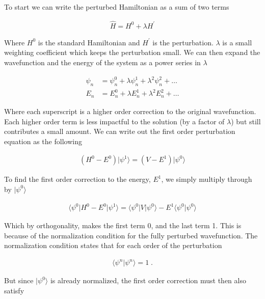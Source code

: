         To start we can write the perturbed Hamiltonian as a sum of two terms

        \begin{align}
            \hat{H} = H^0 + \lambda H^\prime
        \end{align}

        Where $H^0$ is the standard Hamiltonian and $H^\prime$ is the perturbation. $\lambda$ is a small weighting coefficient which keeps the perturbation small. We can then expand the wavefunction and the energy of the system as a power series in $\lambda$

        \begin{align}
            \psi_n &= \psi_n^0 + \lambda \psi_n^1 + \lambda^2 \psi_n^2 + \dots\\
            E_n &= E_n^0 + \lambda E_n^1 + \lambda^2 E_n^2 + \dots
        \end{align}

        Where each superscript is a higher order correction to the original wavefunction. Each higher order term is less impactful to the solution (by a factor of $\lambda$) but still contributes a small amount. We can write out the first order perturbation equation as the following

        \begin{align}
            \left( H^0 - E^0 \right) \vert \psi^1 \rangle = \left(V - E^1 \right) \vert \psi^0 \rangle
        \end{align}

        To find the first order correction to the energy, $E^1$, we simply multiply through by $\vert \psi^0 \rangle$

        \begin{align}
            \langle \psi^0 \vert H^0 - E^0 \vert \psi^1 \rangle = \langle \psi^0 \vert V \vert \psi^0 \rangle -E^1 \langle \psi^0  \vert \psi^0 \rangle
        \end{align}

        Which by orthogonality, makes the first term 0, and the last term 1. This is because of the normalization condition for the fully perturbed wavefunction. The normalization condition states that for each order of the perturbation 
        
        \begin{align}
            \langle \psi^n \vert \psi^n \rangle = 1\;.
        \end{align}

        But since $\vert \psi^0 \rangle$ is already normalized, the first order correction must then also satisfy 

